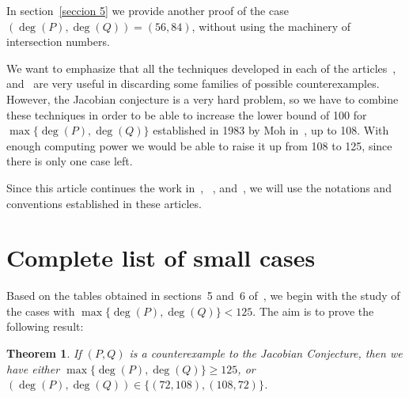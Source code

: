 \documentclass[reqno,a4paper,twoside]{amsart}
\newtheorem{theorem}{Theorem}[section]
\theoremstyle{definition}
\theoremstyle{remark}
\begin{document}
In section~\ref{seccion 5} we provide another
proof of the case $(\deg(P),\deg(Q))=(56,84)$, without using the machinery of intersection numbers.

We want to emphasize that all the techniques developed in each of the articles~\cite{GGV2}, \cite{GGV3} and~\cite{GGV5}
are very useful in discarding some families of possible counterexamples. However, the Jacobian conjecture is a very hard problem,
so we have to combine these techniques in order to be able to increase the lower bound of 100 for $\max\{\deg(P),\deg(Q)\}$
established in 1983 by Moh in~\cite{M}, up to 108. With enough computing power we would be able to raise it up from 108 to 125,
since there is only one case left.

Since this article continues the work in~\cite{GGV1}, ~\cite{GGV2}, \cite{GGV3} and~\cite{GGV5}, we will use the notations and conventions established in these articles.

\section{Complete list of small cases}
\label{seccion 1}
Based on the tables obtained in sections~5 and~6 of~\cite{GGV5}, we begin with the study of the cases with $\max\{\deg(P),\deg(Q)\} < 125$.
The aim is to prove the following result:

\begin{theorem}
	If $(P,Q)$ is a counterexample to the Jacobian Conjecture, then we have either $\max\{\deg(P),\deg(Q)\} \geq 125$, or
$(\deg(P),\deg(Q))\in\{(72,108),(108,72)\}$.
\end{theorem}
\end{document}
